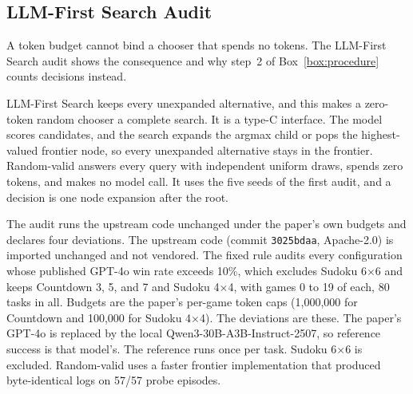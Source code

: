 \subsection{LLM-First Search Audit}
\label{app:results-external-lfs}

A token budget cannot bind a chooser that spends no tokens. The LLM-First Search audit shows the consequence and why step~2 of Box~\ref{box:procedure} counts decisions instead.

LLM-First Search keeps every unexpanded alternative, and this makes a zero-token random chooser a complete search. It is a type-C interface. The model scores candidates, and the search expands the argmax child or pops the highest-valued frontier node, so every unexpanded alternative stays in the frontier. Random-valid answers every query with independent uniform draws, spends zero tokens, and makes no model call. It uses the five seeds of the first audit, and a decision is one node expansion after the root.

The audit runs the upstream code unchanged under the paper's own budgets and declares four deviations. The upstream code (commit \texttt{3025bdaa}, Apache-2.0) is imported unchanged and not vendored. The fixed rule audits every configuration whose published GPT-4o win rate exceeds 10\%, which excludes Sudoku 6$\times$6 and keeps Countdown 3, 5, and 7 and Sudoku 4$\times$4, with games 0 to 19 of each, 80 tasks in all. Budgets are the paper's per-game token caps (1,000,000 for Countdown and 100,000 for Sudoku 4$\times$4). The deviations are these. The paper's GPT-4o is replaced by the local Qwen3-30B-A3B-Instruct-2507, so reference success is that model's. The reference runs once per task. Sudoku 6$\times$6 is excluded. Random-valid uses a faster frontier implementation that produced byte-identical logs on 57/57 probe episodes.

